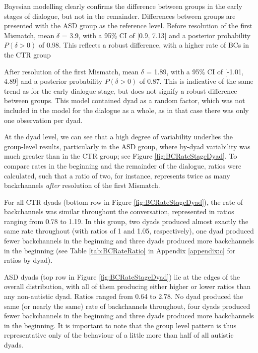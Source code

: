 Bayesian modelling clearly confirms the difference between groups in the early stages of dialogue, but not in the remainder. Differences between groups are presented with the ASD group as the reference level. Before resolution of the first Mismatch, mean \(\delta\) = 3.9, with a 95\% CI of {[}0.9, 7.13{]} and a posterior probability \(P(\delta > 0)\) of 0.98. This reflects a robust difference, with a higher rate of BCs in the CTR group

After resolution of the first Mismatch, mean \(\delta\) = 1.89, with a 95\% CI of {[}-1.01, 4.89{]} and a posterior probability \(P(\delta > 0)\) of 0.87.  This is indicative of the same trend as for the early dialogue stage, but does not signify a robust difference between groups. This model contained dyad as a random factor, which was not included in the model for the dialogue as a whole, as in that case there was only one observation per dyad.

At the dyad level, we can see that a high degree of variability underlies the group-level results, particularly in the ASD group, where by-dyad variability was much greater than in the CTR group; see Figure \ref{fig:BCRateStageDyad}. To compare rates in the beginning and the remainder of the dialogue, ratios were calculated, such that a ratio of two, for instance, represents twice as many backchannels \emph{after} resolution of the first Mismatch.

For all CTR dyads (bottom row in Figure \ref{fig:BCRateStageDyad}), the rate of backchannels was similar throughout the conversation, represented in ratios ranging from 0.78 to 1.19. In this group, two dyads produced almost exactly the same rate throughout (with ratios of 1 and 1.05, respectively), one dyad produced fewer backchannels in the beginning and three dyads produced more backchannels in the beginning (see Table \ref{tab:BCRateRatio} in Appendix \ref{appendix:c} for ratios by dyad).

ASD dyads (top row in Figure \ref{fig:BCRateStageDyad}) lie at the edges of the overall distribution, with all of them producing either higher or lower ratios than any non-autistic dyad. Ratios ranged from 0.64 to 2.78. No dyad produced the same (or nearly the same) rate of backchannels throughout, four dyads produced fewer backchannels in the beginning and three dyads produced more backchannels in the beginning. It is important to note that the group level pattern is thus representative only of the behaviour of a little more than half of all autistic dyads.



